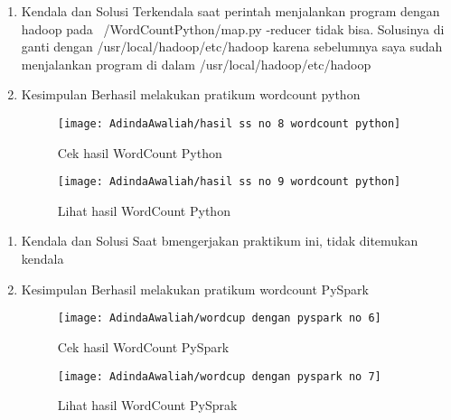 \begin{enumerate}
\item Kendala dan Solusi
\newline Terkendala saat perintah menjalankan program dengan hadoop pada ~/WordCountPython/map.py -reducer tidak bisa. Solusinya  di ganti dengan /usr/local/hadoop/etc/hadoop karena sebelumnya saya sudah menjalankan program di dalam /usr/local/hadoop/etc/hadoop

\item Kesimpulan
\newline Berhasil melakukan pratikum wordcount python

\begin{figure}[!ht]
\texttt{[image: AdindaAwaliah/hasil ss no 8 wordcount python]}
\caption{Cek hasil WordCount Python}
\label{gam:hasil ss no 8 wordcount python}
\end{figure}

\begin{figure}[!ht]
\texttt{[image: AdindaAwaliah/hasil ss no 9 wordcount python]}
\caption{Lihat hasil WordCount Python}
\label{gam:hasil ss no 9 wordcount python}
\end{figure}

\end{enumerate}


\begin{enumerate}
\item Kendala dan Solusi
\newline Saat bmengerjakan praktikum ini, tidak ditemukan kendala

\item Kesimpulan
\newline Berhasil melakukan pratikum wordcount PySpark

\begin{figure}[!ht]
\texttt{[image: AdindaAwaliah/wordcup dengan pyspark no 6]}
\caption{Cek hasil WordCount PySpark}
\label{gam:wordcup dengan pyspark no 6}
\end{figure}

\begin{figure}[!ht]
\texttt{[image: AdindaAwaliah/wordcup dengan pyspark no 7]}
\caption{Lihat hasil WordCount PySprak}
\label{gam:wordcup dengan pyspark no 7}
\end{figure}

\end{enumerate}

